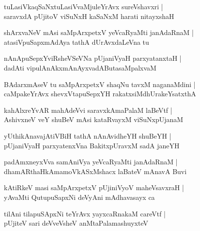 \documentclass[twoside,12pt,openright]{book}
\newcounter{shloka}[chapter]
\begin{document}
\begin{shloka}%
tuLasiVkaqSaNxtuLasiVvaMjuleYrAvx sureVshavxri |\\
saravxdA pUjitoV viSuNxH kaSaNxM harati nitayxshaH 
\end{shloka}

\begin{shloka}%
shArxvaNeV mAsi saMpArxpetxV yeVcaRyaMti janAdaRnaM |\\
atasiVpuSapxmAdAya tathA dUrAvxdaLeVna tu 
\end{shloka}

\begin{shloka}%
nAnApuSepxYviRsheVSeVNa pUjaniVyaH parxyatanxtaH |\\
dadAti vipulAnAkxmAnAyxvadAButasaMpalxvaM 
\end{shloka}

\begin{shloka}%
BAdarxmAseV tu saMpArxpetxV shaqNu tavxM naganaMdini |\\
caMpakeYrAvx shevxVtapuSepxYH rakatxsiMdhUrakeYsatxthA 
\end{shloka}

\begin{shloka}%
kahAlxreYvAR mahAdeVvi saravxkAmaPalaM laBeVtf |\\
AshivxneV veY shuBeV mAsi kataRvayxM viSuNxpUjanaM 
\end{shloka}

\begin{shloka}%
yUthikAnavajAtiVBiH tathA nAnAvidheYH shuBeYH |\\
pUjaniVyaH parxyatenxVna BakitxpUravxM sadA janeYH 
\end{shloka}

\begin{shloka}%
padAmxneyxVva samAniVya yeVcaRyaMti janAdaRnaM |\\
dhamARthaHkAmamoVkASxMshacx laBateV mAnavA Buvi
\end{shloka}

\begin{shloka}%
kAtiRkeV masi saMpArxpetxV pUjiniVyoV maheVsavxraH |\\
yAvaMti QutupuSapxNi deVyAni mAdhavasayx ca 
\end{shloka}

\begin{shloka}%
tilAni tilapuSApxNi teYrAvx yayxcaRnakaM careVtf |\\
pUjiteV sari deVveVsheV anMtaPalamashuyxteV
\end{shloka}
\end{document}
